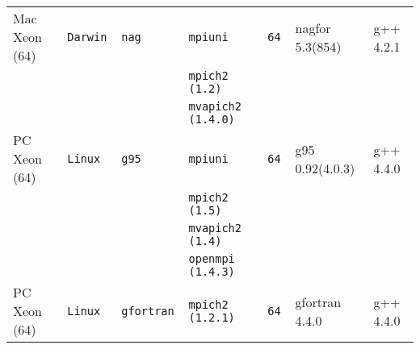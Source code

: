 \begin{longtable}{lllllll}
Mac Xeon (64)         &\tt Darwin &\tt nag          &\tt mpiuni           &\tt 64           & nagfor \footnotesize 5.3(854)       & g++ \footnotesize 4.2.1         \\ %
                      &           &                 &\tt mpich2 (1.2)     &                 &                                     &                                 \\
                      &           &                 &\tt mvapich2 (1.4.0) &                 &                                     &                                 \\
PC Xeon (64)          &\tt Linux  &\tt g95          &\tt mpiuni           &\tt 64           & g95 \footnotesize 0.92(4.0.3)       & g++  \footnotesize 4.4.0        \\ %
                      &           &                 &\tt mpich2 (1.5)     &                 &                                     &                                 \\
                      &           &                 &\tt mvapich2 (1.4)   &                 &                                     &                                 \\
                      &           &                 &\tt openmpi (1.4.3)  &                 &                                     &                                 \\
PC Xeon (64)          &\tt Linux  &\tt gfortran     &\tt mpich2 (1.2.1)   &\tt 64           & gfortran \footnotesize 4.4.0        & g++  \footnotesize 4.4.0        \\ %

\end{longtable}
